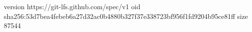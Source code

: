 version https://git-lfs.github.com/spec/v1
oid sha256:53d7bea4febeb6a27d32ac0b4880b327f37e338723bf956f1fd9204b95ce81ff
size 87544
